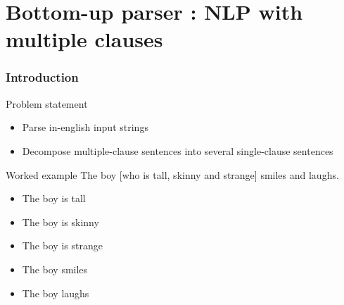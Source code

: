 \documentclass{beamer}
\begin{document}
\begin{frame}\tableofcontents\end{frame}

\section{Bottom-up parser : NLP with multiple clauses}

\begin{frame}
    \frametitle{Introduction}
    \begin{block}{Problem statement}
        \begin{itemize}
            \item Parse in-english input strings
            \item Decompose multiple-clause sentences into several single-clause sentences
        \end{itemize}
    \end{block}

    \begin{exampleblock}{Worked example}
        The boy [who is tall, skinny and strange] smiles and laughs.
        \begin{itemize}
            \item The boy is tall
            \item The boy is skinny
            \item The boy is strange
            \item The boy smiles
            \item The boy laughs
        \end{itemize}
    \end{exampleblock}
\end{frame}
\end{document}
